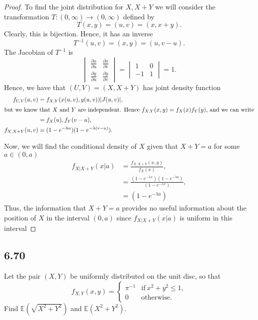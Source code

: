 \documentclass{article}
\newcommand{\partiald}[2]{\frac{\partial #1}{\partial #2}}
\newcommand{\E}[1]{\mathbb{E}(#1)}
\begin{document}
\begin{proof}
    To find the joint distribution for $X, X + Y$ we will consider the
    transformation $T: (0,\infty) \rightarrow (0,\infty)$ defined by
    \[T(x,y) = (u,v) = (x, x+y).\]
    Clearly, this is bijection. Hence, it has an inverse
    \[T^{-1}(u,v) = (x, y) = (u, v-u).\]
    The Jacobian of $T^{-1}$ is
    \begin{equation*}
        \begin{vmatrix}
            \partiald{x}{u} & \partiald{x}{v} \\
            \partiald{y}{u} & \partiald{y}{v}
        \end{vmatrix} =
        \begin{vmatrix}
            1  & 0 \\
            -1 & 1
        \end{vmatrix} = 1.
    \end{equation*}
    Hence, we have that $(U,V) = (X, X+Y)$ has joint density function
    \begin{align*}
        f_{U,V}(u,v)      & = f_{X,Y}(x(u,v),y(u,v))|J(u,v)|,             \\
        \intertext{but we know that $X$ and $Y$ are independent. Hence
            $f_{X,Y}(x,y) = f_X(x)f_Y(y)$, and we can write}
                          & = f_X(u), f_Y(v - u),                         \\
        f_{X, X + Y}(u,v) & = (1-e^{-\lambda u})(1-e^{-\lambda (v - u)}).
    \end{align*}

    Now, we will find the conditional density of $X$ given that $X + Y = a$
    for some $a \in (0,a)$
    \begin{align*}
        f_{X|X + Y}(x | a) & = \frac{f_{X, X+Y}(x,y)}{f_X(x)},                                  \\
                           & = \frac{(1-e^{-\lambda x})(1-e^{-\lambda a})}{(1-e^{-\lambda x})}, \\
                           & = (1-e^{-\lambda a})
    \end{align*}
    Thus, the information that $X + Y = a$ provides no useful information
    about the position of $X$ in the interval $(0,a)$ since
    $f_{X|X + Y}(x | a)$ is uniform in this interval
\end{proof}

\subsection*{6.70}
Let the pair $(X,Y)$ be uniformly distributed on the unit disc, so that
\begin{equation*}
    f_{X,Y}(x,y) = \begin{cases}
        \pi^{-1} & \text{if} \ x^2 + y^2 \leq 1, \\
        0        & \text{otherwise}.
    \end{cases}
\end{equation*}
Find $\E{\sqrt{X^2 + Y^2}}$ and $\E{X^2 + Y^2}$.
\end{document}
